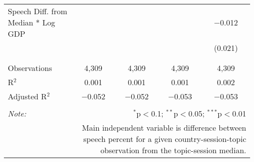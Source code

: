 \begin{table}[!htbp]
\begin{tabular}{@{\extracolsep{5pt}}lcccc}
 Speech Diff. from Median * Log GDP &  &  &  & $-$0.012 \\ 
  &  &  &  & (0.021) \\ 
  & & & & \\ 
\hline \\[-1.8ex] 
Observations & 4,309 & 4,309 & 4,309 & 4,309 \\ 
R$^{2}$ & 0.001 & 0.001 & 0.001 & 0.002 \\ 
Adjusted R$^{2}$ & $-$0.052 & $-$0.052 & $-$0.053 & $-$0.053 \\ 
\hline 
\hline \\[-1.8ex] 
\textit{Note:}  & \multicolumn{4}{r}{$^{*}$p$<$0.1; $^{**}$p$<$0.05; $^{***}$p$<$0.01} \\ 
 & \multicolumn{4}{r}{Main independent variable is difference between speech percent for a given country-session-topic observation from the topic-session median.} \\ 
\end{tabular} 
\end{table} 
